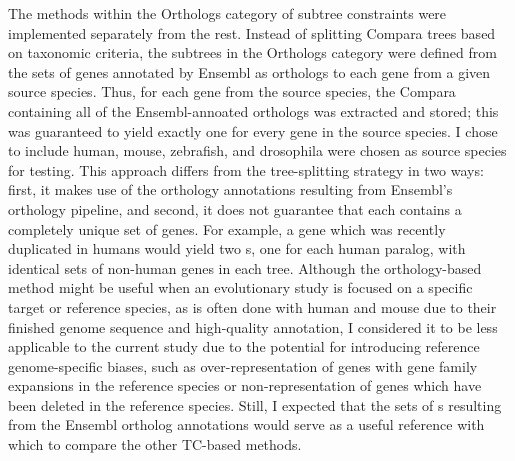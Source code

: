 The methods within the Orthologs category of subtree constraints were
implemented separately from the rest. Instead of splitting Compara
trees based on taxonomic criteria, the subtrees in the Orthologs
category were defined from the sets of genes annotated by Ensembl as
orthologs to each gene from a given source species. Thus, for each
gene from the source species, the Compara \subtr{} containing all of
the Ensembl-annoated orthologs was extracted and stored; this was
guaranteed to yield exactly one \subtr{} for every gene in the source
species. I chose to include human, mouse, zebrafish, and drosophila
were chosen as source species for testing. This approach differs from
the tree-splitting strategy in two ways: first, it makes use of the
orthology annotations resulting from Ensembl's orthology pipeline, and
second, it does not guarantee that each \subtr{} contains a completely
unique set of genes. For example, a gene which was recently duplicated
in humans would yield two \subtr{}s, one for each human paralog, with
identical sets of non-human genes in each tree. Although the
orthology-based method might be useful when an evolutionary study is
focused on a specific target or reference species, as is often done
with human and mouse due to their finished genome sequence and
high-quality annotation, I considered it to be less applicable to the
current study due to the potential for introducing reference
genome-specific biases, such as over-representation of genes with gene
family expansions in the reference species or non-representation of
genes which have been deleted in the reference species. Still, I
expected that the sets of \subtr{}s resulting from the Ensembl
ortholog annotations would serve as a useful reference with which to
compare the other TC-based methods.

